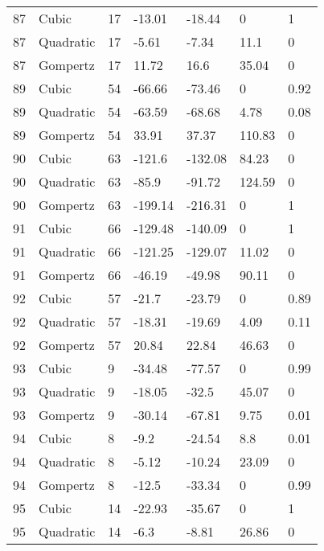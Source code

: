 \documentclass[11pt]{article}
\begin{document}
\begin{center}
\begin{longtable}{lllllll}
    87  & Cubic     & 17              & -13.01  & -18.44  & 0       & 1    \\
    87  & Quadratic & 17              & -5.61   & -7.34   & 11.1    & 0    \\
    87  & Gompertz  & 17              & 11.72   & 16.6    & 35.04   & 0    \\
    89  & Cubic     & 54              & -66.66  & -73.46  & 0       & 0.92 \\
    89  & Quadratic & 54              & -63.59  & -68.68  & 4.78    & 0.08 \\
    89  & Gompertz  & 54              & 33.91   & 37.37   & 110.83  & 0    \\
    90  & Cubic     & 63              & -121.6  & -132.08 & 84.23   & 0    \\
    90  & Quadratic & 63              & -85.9   & -91.72  & 124.59  & 0    \\
    90  & Gompertz  & 63              & -199.14 & -216.31 & 0       & 1    \\
    91  & Cubic     & 66              & -129.48 & -140.09 & 0       & 1    \\
    91  & Quadratic & 66              & -121.25 & -129.07 & 11.02   & 0    \\
    91  & Gompertz  & 66              & -46.19  & -49.98  & 90.11   & 0    \\
    92  & Cubic     & 57              & -21.7   & -23.79  & 0       & 0.89 \\
    92  & Quadratic & 57              & -18.31  & -19.69  & 4.09    & 0.11 \\
    92  & Gompertz  & 57              & 20.84   & 22.84   & 46.63   & 0    \\
    93  & Cubic     & 9               & -34.48  & -77.57  & 0       & 0.99 \\
    93  & Quadratic & 9               & -18.05  & -32.5   & 45.07   & 0    \\
    93  & Gompertz  & 9               & -30.14  & -67.81  & 9.75    & 0.01 \\
    94  & Cubic     & 8               & -9.2    & -24.54  & 8.8     & 0.01 \\
    94  & Quadratic & 8               & -5.12   & -10.24  & 23.09   & 0    \\
    94  & Gompertz  & 8               & -12.5   & -33.34  & 0       & 0.99 \\
    95  & Cubic     & 14              & -22.93  & -35.67  & 0       & 1    \\
    95  & Quadratic & 14              & -6.3    & -8.81   & 26.86   & 0    \\

\end{longtable}
\end{center}
\end{document}
